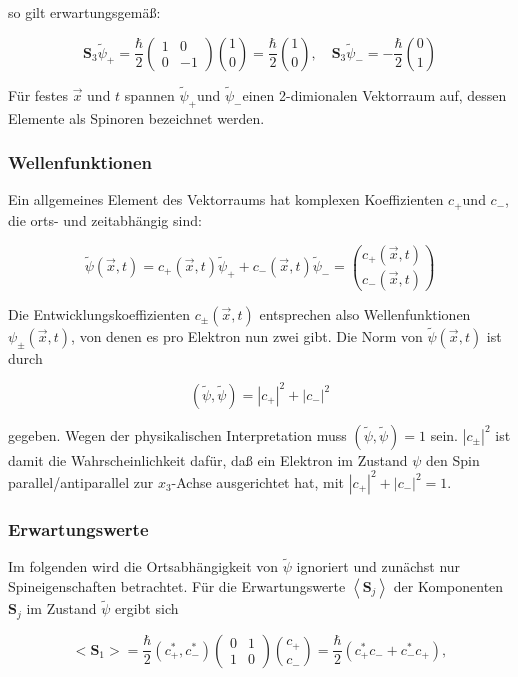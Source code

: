 \documentclass[10pt, letterpaper]{article}
\begin{document}
so gilt erwartungsgemäß:

$$
\mathbf{S}_{3} \tilde{\psi}_{+}=\frac{\hbar}{2}\left(\begin{array}{cc}
1 & 0 \\
0 & -1
\end{array}\right)\binom{1}{0}=\frac{\hbar}{2}\binom{1}{0}, \quad \mathbf{S}_{3} \tilde{\psi}_{-}=-\frac{\hbar}{2}\binom{0}{1}
$$

Für festes $\vec{x}$ und $t$ spannen $\tilde{\psi}_{+}$und $\tilde{\psi}_{-}$einen 2-dimionalen Vektorraum auf, dessen Elemente als Spinoren bezeichnet werden.

\subsubsection*{Wellenfunktionen}
Ein allgemeines Element des Vektorraums hat komplexen Koeffizienten $c_{+}$und $c_{-}$, die orts- und zeitabhängig sind:

$$
\tilde{\psi}(\vec{x}, t)=c_{+}(\vec{x}, t) \tilde{\psi}_{+}+c_{-}(\vec{x}, t) \tilde{\psi}_{-}=\binom{c_{+}(\vec{x}, t)}{c_{-}(\vec{x}, t)}
$$

Die Entwicklungskoeffizienten $c_{ \pm}(\vec{x}, t)$ entsprechen also Wellenfunktionen $\psi_{ \pm}(\vec{x}, t)$, von denen es pro Elektron nun zwei gibt. Die Norm von $\tilde{\psi}(\vec{x}, t)$ ist durch

$$
(\tilde{\psi}, \tilde{\psi})=\left|c_{+}\right|^{2}+\left|c_{-}\right|^{2}
$$

gegeben. Wegen der physikalischen Interpretation muss $(\tilde{\psi}, \tilde{\psi})=1$ sein. $\left|c_{ \pm}\right|^{2}$ ist damit die Wahrscheinlichkeit dafür, daß ein Elektron im Zustand $\psi$ den Spin parallel/antiparallel zur $x_{3}$-Achse ausgerichtet hat, mit $\left|c_{+}\right|^{2}+\left|c_{-}\right|^{2}=1$.

\subsubsection*{Erwartungswerte}
Im folgenden wird die Ortsabhängigkeit von $\tilde{\psi}$ ignoriert und zunächst nur Spineigenschaften betrachtet. Für die Erwartungswerte $\left\langle\mathbf{S}_{j}\right\rangle$ der Komponenten $\mathbf{S}_{j}$ im Zustand $\tilde{\psi}$ ergibt sich

$$
<\mathbf{S}_{1}>=\frac{\hbar}{2}\left(c_{+}^{*}, c_{-}^{*}\right)\left(\begin{array}{ll}
0 & 1 \\
1 & 0
\end{array}\right)\binom{c_{+}}{c_{-}}=\frac{\hbar}{2}\left(c_{+}^{*} c_{-}+c_{-}^{*} c_{+}\right),
$$
\end{document}
